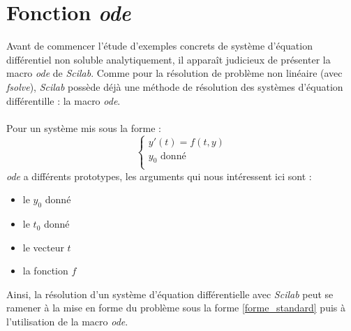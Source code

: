 \documentclass[a4paper,10pt]{report}
\begin{document}
\section{Fonction \textit{ode}}
Avant de commencer l'étude d'exemples concrets de système d'équation différentiel non soluble analytiquement, il apparaît judicieux de présenter la macro \textit{ode} de \textit{Scilab}. Comme pour la résolution de problème non linéaire (avec \textit{fsolve}), \textit{Scilab} possède déjà une méthode de résolution des systèmes d'équation différentille : la macro \textit{ode}.\\ \\
Pour un système mis sous la forme :
\begin{equation}
\label{forme_standard}
\left\lbrace
\begin{array}{l}
y'(t)= f(t,y)  \\
y_0 \text{ donné} \\
\end{array}\right.
\end{equation}
\textit{ode} a différents prototypes, les arguments qui nous intéressent ici sont :
\begin{itemize}
\item le $y_0$ donné
\item le $t_0$ donné
\item le vecteur $t$
\item la fonction $f$
\end{itemize}
\indent Ainsi, la résolution d'un système d'équation différentielle avec \textit{Scilab} peut se ramener à la mise en forme du problème sous la forme \ref{forme_standard} puis à l'utilisation de la macro \textit{ode}.
\end{document}
